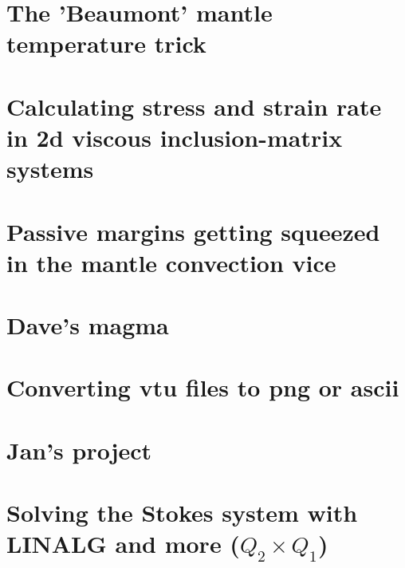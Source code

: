 \documentclass[a4paper,11pt]{report}
\begin{document}
\chapter{The 'Beaumont' mantle temperature trick \label{f141}} %

\chapter{Calculating stress and strain rate in 2d viscous inclusion-matrix systems \label{f142}} %

\chapter{Passive margins getting squeezed in the mantle convection vice \label{f143}} %

\chapter{Dave's magma \label{f144}} %

\chapter{Converting vtu files to png or ascii \label{f145}} %

\chapter{Jan's project \label{f146}} %

\chapter{Solving the Stokes system with LINALG and more ($Q_2\times Q_1$)} %
\end{document}
